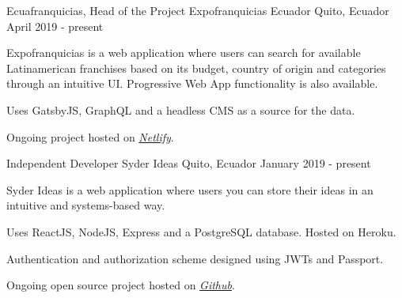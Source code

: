 \begin{cventries}
  \cventry
    {Ecuafranquicias, Head of the Project}
    {Expofranquicias Ecuador}
    {Quito, Ecuador}
    {April 2019 - present}
    {
      \begin{cvitems}
        \item {Expofranquicias is a web application where users can search for available Latinamerican franchises based on its budget, country of origin and categories through an intuitive UI. Progressive Web App functionality is also available.}
        \item {Uses GatsbyJS, GraphQL and a headless CMS as a source for the data. }
        \item {Ongoing project hosted on \href{https://expofranquiciasecuador.com/franquicias-disponibles}{\textit{Netlify}}.}
      \end{cvitems}
    }

  \cventry
    {Independent Developer}
    {Syder Ideas}
    {Quito, Ecuador}
    {January 2019 - present}
    {
      \begin{cvitems}
        \item {Syder Ideas is a web application where users you can store their ideas in an intuitive and systems-based way.}
        \item {Uses ReactJS, NodeJS, Express and a PostgreSQL database. Hosted on Heroku.}
        \item {Authentication and authorization scheme designed using JWTs and Passport.}
        \item {Ongoing open source project hosted on \href{https://github.com/guidosantillan01/syder-ideas}{\textit{Github}}.}
      \end{cvitems}
    }
\end{cventries}
